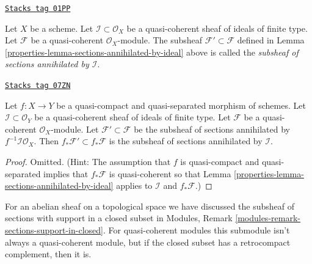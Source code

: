 \begin{definition}
\label{properties-definition-subsheaf-sections-annihilated-by-ideal}
\href{https://stacks.math.columbia.edu/tag/01PP}{\texttt{Stacks tag 01PP}}

Let $X$ be a scheme.
Let $\mathcal{I} \subset \mathcal{O}_X$ be a quasi-coherent sheaf of ideals
of finite type.
Let $\mathcal{F}$ be a quasi-coherent $\mathcal{O}_X$-module.
The subsheaf $\mathcal{F}' \subset \mathcal{F}$ defined in
Lemma \ref{properties-lemma-sections-annihilated-by-ideal} above is called
the {\it subsheaf of sections annihilated by $\mathcal{I}$}.
\end{definition}

\begin{lemma}
\label{properties-lemma-push-sections-annihilated-by-ideal}
\href{https://stacks.math.columbia.edu/tag/07ZN}{\texttt{Stacks tag 07ZN}}

Let $f : X \to Y$ be a quasi-compact and quasi-separated morphism
of schemes. Let $\mathcal{I} \subset \mathcal{O}_Y$ be a quasi-coherent
sheaf of ideals of finite type. Let $\mathcal{F}$ be a quasi-coherent
$\mathcal{O}_X$-module. Let $\mathcal{F}' \subset \mathcal{F}$
be the subsheaf of sections annihilated by $f^{-1}\mathcal{I}\mathcal{O}_X$.
Then $f_*\mathcal{F}' \subset f_*\mathcal{F}$ is the subsheaf
of sections annihilated by $\mathcal{I}$.
\end{lemma}

\begin{proof}

Omitted. (Hint: The assumption that $f$ is quasi-compact and
quasi-separated implies that $f_*\mathcal{F}$ is quasi-coherent
so that Lemma \ref{properties-lemma-sections-annihilated-by-ideal} applies
to $\mathcal{I}$ and $f_*\mathcal{F}$.)
\end{proof}

For an abelian sheaf on a topological space we have discussed the subsheaf
of sections with support in a closed subset in
Modules, Remark \ref{modules-remark-sections-support-in-closed}.
For quasi-coherent modules this submodule isn't always a quasi-coherent
module, but if the closed subset has a retrocompact complement, then
it is.

